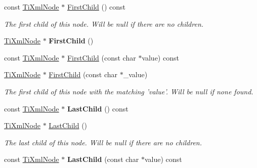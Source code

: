 \begin{DoxyCompactItemize}
\item 
\hypertarget{class_ti_xml_node_a44c8eee26bbe2d1b2762038df9dde2f0}{
const \hyperlink{class_ti_xml_node}{TiXmlNode} $\ast$ \hyperlink{class_ti_xml_node_a44c8eee26bbe2d1b2762038df9dde2f0}{FirstChild} () const }
\label{class_ti_xml_node_a44c8eee26bbe2d1b2762038df9dde2f0}

\begin{DoxyCompactList}\small\item\em The first child of this node. Will be null if there are no children. \item\end{DoxyCompactList}\item 
\hypertarget{class_ti_xml_node_a5e97d69b7c0ebd27fb7286be56559b77}{
\hyperlink{class_ti_xml_node}{TiXmlNode} $\ast$ {\bfseries FirstChild} ()}
\label{class_ti_xml_node_a5e97d69b7c0ebd27fb7286be56559b77}

\item 
const \hyperlink{class_ti_xml_node}{TiXmlNode} $\ast$ \hyperlink{class_ti_xml_node_a1f05828d023150706eeb16d6fb3f6355}{FirstChild} (const char $\ast$value) const 
\item 
\hypertarget{class_ti_xml_node_abc8bf32be6419ec453a731868de19554}{
\hyperlink{class_ti_xml_node}{TiXmlNode} $\ast$ \hyperlink{class_ti_xml_node_abc8bf32be6419ec453a731868de19554}{FirstChild} (const char $\ast$\_\-value)}
\label{class_ti_xml_node_abc8bf32be6419ec453a731868de19554}

\begin{DoxyCompactList}\small\item\em The first child of this node with the matching 'value'. Will be null if none found. \item\end{DoxyCompactList}\item 
\hypertarget{class_ti_xml_node_a6d671107e00cca1d28cb2d7f3a87a21e}{
const \hyperlink{class_ti_xml_node}{TiXmlNode} $\ast$ {\bfseries LastChild} () const }
\label{class_ti_xml_node_a6d671107e00cca1d28cb2d7f3a87a21e}

\item 
\hypertarget{class_ti_xml_node_a6432d2b2495f6caf9cb4278df706a031}{
\hyperlink{class_ti_xml_node}{TiXmlNode} $\ast$ \hyperlink{class_ti_xml_node_a6432d2b2495f6caf9cb4278df706a031}{LastChild} ()}
\label{class_ti_xml_node_a6432d2b2495f6caf9cb4278df706a031}

\begin{DoxyCompactList}\small\item\em The last child of this node. Will be null if there are no children. \item\end{DoxyCompactList}\item 
\hypertarget{class_ti_xml_node_ae9e2a400ef5156155df3eff16d88bf37}{
const \hyperlink{class_ti_xml_node}{TiXmlNode} $\ast$ {\bfseries LastChild} (const char $\ast$value) const }
\label{class_ti_xml_node_ae9e2a400ef5156155df3eff16d88bf37}


\end{DoxyCompactItemize}
